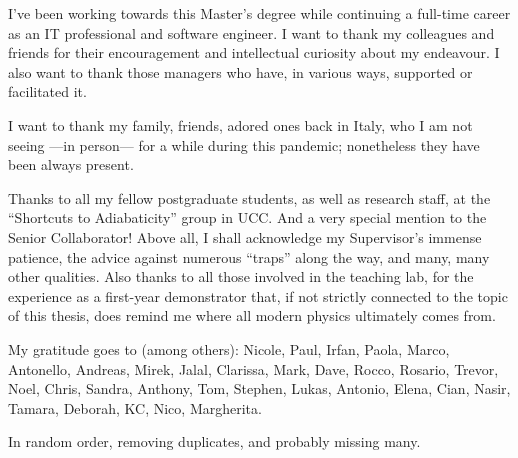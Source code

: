 {

  I've been working towards this Master's degree
  while continuing a full-time career
  as an IT professional and software engineer.
  I want to thank my
  colleagues and friends for their encouragement
  and intellectual curiosity
  about my endeavour.
  I also want to thank those managers
  who have, in various ways, supported or facilitated it.

  I want to thank my family, friends, adored ones back in Italy,
  who I am not seeing ---in person--- for a while during this pandemic;
  nonetheless they have been always present.
  
  Thanks to all my fellow postgraduate students,
  as well as research staff,
  at the ``Shortcuts to Adiabaticity'' group in UCC.
  And a very special mention to the Senior Collaborator!
  Above all, I shall acknowledge my Supervisor's immense patience,
  the advice against numerous ``traps'' along the way, and many, many other qualities.
  Also thanks to all those involved in the teaching lab, for the experience as a
  first-year demonstrator that,
  if not strictly connected to the topic of this thesis,
  does remind me where all modern physics ultimately comes from.

  My gratitude goes to (among others):
  Nicole,
  Paul,
  Irfan,
  Paola,
  Marco,
  Antonello,
  Andreas,
  Mirek,
  Jalal,
  Clarissa,
  Mark,
  Dave,
  Rocco,
  Rosario,
  Trevor,
  Noel,
  Chris,
  Sandra,
  Anthony,
  Tom,
  Stephen,
  Lukas,
  Antonio,
  Elena,
  Cian,
  Nasir,
  Tamara,
  Deborah,
  KC,
  Nico,
  Margherita.

  In random order, removing duplicates, and probably missing many.
}
